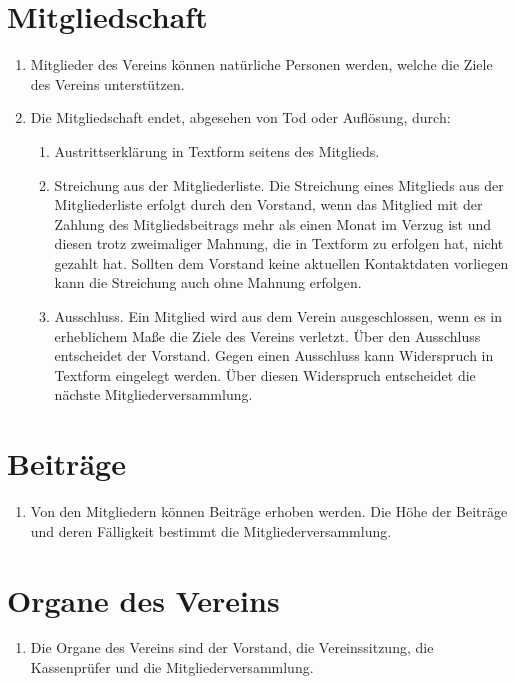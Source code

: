 \documentclass[a4paper]{scrartcl}
\begin{document}
\section{Mitgliedschaft}
\begin{enumerate}
    \item Mitglieder des Vereins können natürliche Personen werden, welche die
          Ziele des Vereins unterstützen.
    \item Die Mitgliedschaft endet, abgesehen von Tod oder Auflösung, durch:
    \begin{enumerate}
        \item Austrittserklärung in Textform seitens des Mitglieds.
        \item Streichung aus der Mitgliederliste. Die Streichung eines
              Mitglieds aus der Mitgliederliste erfolgt durch den Vorstand,
              wenn das Mitglied mit der Zahlung des Mitgliedsbeitrags mehr als
              einen Monat im Verzug ist und diesen trotz zweimaliger Mahnung,
              die in Textform zu erfolgen hat, nicht gezahlt hat. Sollten dem
              Vorstand keine aktuellen Kontaktdaten vorliegen kann die
              Streichung auch ohne Mahnung erfolgen.
        \item Ausschluss. Ein Mitglied wird aus dem Verein ausgeschlossen, wenn
              es in erheblichem Maße die Ziele des Vereins verletzt. Über den
              Ausschluss entscheidet der Vorstand. Gegen einen Ausschluss kann
              Widerspruch in Textform eingelegt werden. Über diesen Widerspruch
              entscheidet die nächste Mitgliederversammlung.
    \end{enumerate}
\end{enumerate}


\section{Beiträge}
\begin{enumerate}
    \item Von den Mitgliedern können Beiträge erhoben werden. Die Höhe der
          Beiträge und deren Fälligkeit bestimmt die Mitgliederversammlung.
\end{enumerate}


\section{Organe des Vereins}
\begin{enumerate}
    \item Die Organe des Vereins sind der Vorstand, die Vereinssitzung, die
          Kassenprüfer und die Mitgliederversammlung.
\end{enumerate}
\end{document}
